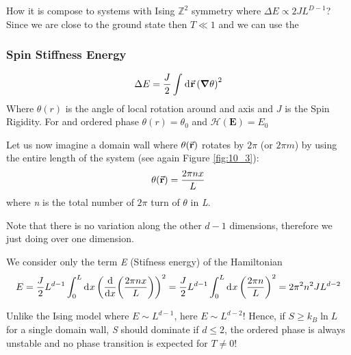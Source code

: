 \documentclass[../../Main/Main.tex]{subfiles}
\begin{document}
How it is compose to systems with Ising $\mathbb{Z}^{2}$ symmetry where $\Delta E \propto 2JL^{D-1}$? Since we are close to the ground state then $T \ll 1$ and we can use the
\subsubsection{Spin Stiffness Energy}
  \begin{equation}
    \Delta E = \frac{J}{2} \int_{}^{} \dd[]{\va{r}} \qty(\grad \theta )^2
  \end{equation}
Where $\theta(r)$ is the angle of local rotation around and axis and $J$ is the Spin Rigidity. For and ordered phase $\theta(r) = \theta_0$ and $\mathcal{H}(\mathbf{E}) = E_{0}$

Let us now imagine a domain wall where \(\theta (\va{r})  \)  rotates by \( 2 \pi  \) (or \( 2 \pi m \)) by using the entire length of the system (see again Figure \ref{fig:10_3}):
\begin{equation*}
  \theta (\va{r}) = \frac{2 \pi n x}{L}
\end{equation*}
where \emph{n} is the total number of \( 2 \pi  \) turn of \( \theta  \) in \emph{L}. 
\begin{remark}
Note that there is no variation along the other \( d-1 \) dimensions, therefore we just doing over one dimension.
\end{remark}

We consider only the term \emph{E} (Stifness energy) of the Hamiltonian 
 \begin{equation}
   E = \frac{J}{2} L^{d-1} \int_{0}^{L} \dd[]{x} \qty(\dv{}{x} \qty(\frac{2 \pi n x}{L})  )^2 = \frac{J}{2} L^{d-1} \int_{0}^{L} \dd[]{x} \qty(\frac{2 \pi n}{L})^2 = 2 \pi ^2 n^2 J L^{d-2}
 \end{equation}
\begin{remark}
Unlike the Ising model where \( E \sim L^{d-1} \), here \( E \sim L^{d-2} \)! Hence, if \( S \ge k_B \ln{L}  \) for a single domain wall, \emph{S} should dominate if \( d \le 2 \), the ordered phase is always unstable and no phase transition is expected for \( T \neq 0 \)!
\end{remark}
\end{document}
